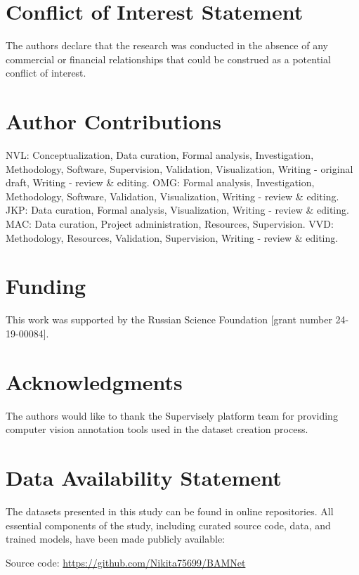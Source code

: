 \documentclass[utf8]{FrontiersinHarvard}
\begin{document}
\section*{Conflict of Interest Statement}

The authors declare that the research was conducted in the absence of any commercial or financial relationships that could be 
construed as a potential conflict of interest.

\section*{Author Contributions}

NVL: Conceptualization, Data curation, Formal analysis, Investigation, Methodology, Software, Supervision, Validation, Visualization, 
Writing - original draft, Writing - review \& editing. OMG: Formal analysis, Investigation, Methodology, Software, Validation, 
Visualization, Writing - review \& editing. JKP: Data curation, Formal analysis, Visualization, Writing - review \& editing. MAC: 
Data curation, Project administration, Resources, Supervision. VVD: Methodology, Resources, Validation, Supervision, Writing - review \& editing.

\section*{Funding}

This work was supported by the Russian Science Foundation [grant number 24-19-00084].

\section*{Acknowledgments}

The authors would like to thank the Supervisely platform team for providing computer vision annotation tools used in the dataset creation process.

\section*{Data Availability Statement}

The datasets presented in this study can be found in online repositories. All essential components of the study, including curated 
source code, data, and trained models, have been made publicly available:

Source code: \url{https://github.com/Nikita75699/BAMNet}
\end{document}

